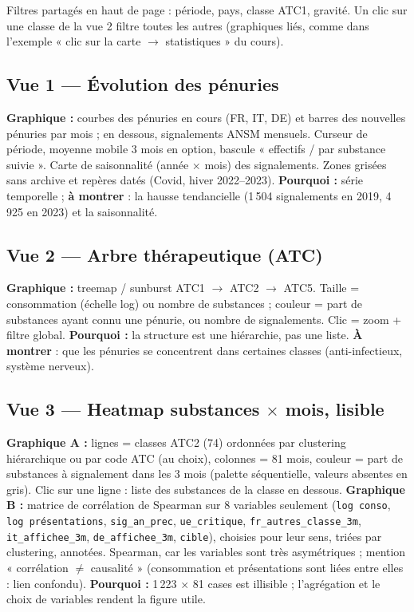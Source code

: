 \documentclass[10.5pt, a4paper]{article}
\newcommand{\var}[1]{\texttt{\color{gris!30!black}#1}}
\begin{document}
Filtres partagés en haut de page : période, pays, classe ATC1, gravité. Un clic sur une classe de la vue 2
filtre toutes les autres (graphiques liés, comme dans l'exemple « clic sur la carte $\to$ statistiques » du cours).

\subsection*{Vue 1 --- Évolution des pénuries}
\textbf{Graphique :} courbes des pénuries en cours (FR, IT, DE) et barres des nouvelles pénuries par mois ; en dessous, signalements ANSM
mensuels. Curseur de période, moyenne mobile 3 mois en option, bascule « effectifs / par substance suivie ».
Carte de saisonnalité (année $\times$ mois) des signalements. Zones grisées sans archive et repères datés (Covid, hiver 2022--2023).
\textbf{Pourquoi :} série temporelle ; \textbf{à montrer} : la hausse tendancielle (1\,504 signalements en 2019, 4\,925 en 2023) et la saisonnalité.

\subsection*{Vue 2 --- Arbre thérapeutique (ATC)}
\textbf{Graphique :} treemap / sunburst ATC1 $\to$ ATC2 $\to$ ATC5. Taille = consommation (échelle log) ou nombre de substances ;
couleur = part de substances ayant connu une pénurie, ou nombre de signalements. Clic = zoom + filtre global.
\textbf{Pourquoi :} la structure est une hiérarchie, pas une liste. \textbf{À montrer} : que les pénuries se concentrent dans certaines classes (anti-infectieux, système nerveux).

\subsection*{Vue 3 --- Heatmap substances $\times$ mois, lisible}
\textbf{Graphique A :} lignes = classes ATC2 (74) ordonnées par clustering hiérarchique ou par code ATC (au choix), colonnes = 81 mois,
couleur = part de substances à signalement dans les 3 mois (palette séquentielle, valeurs absentes en gris). Clic sur une ligne :
liste des substances de la classe en dessous.
\textbf{Graphique B :} matrice de corrélation de Spearman sur 8 variables seulement
(\var{log conso}, \var{log présentations}, \var{sig\_an\_prec}, \var{ue\_critique}, \var{fr\_autres\_classe\_3m}, \var{it\_affichee\_3m}, \var{de\_affichee\_3m}, \var{cible}),
choisies pour leur sens, triées par clustering, annotées. Spearman, car les variables sont très asymétriques ; mention
« corrélation $\neq$ causalité » (consommation et présentations sont liées entre elles : lien confondu).
\textbf{Pourquoi :} 1\,223 $\times$ 81 cases est illisible ; l'agrégation et le choix de variables rendent la figure utile.
\end{document}
